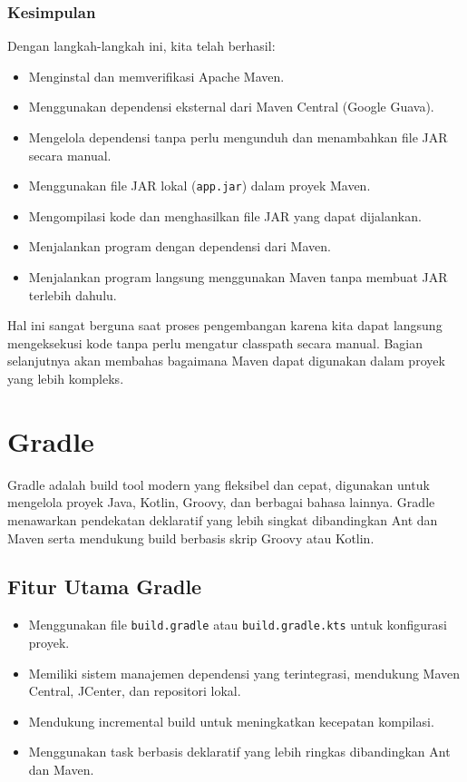 \subsubsection{Kesimpulan}
Dengan langkah-langkah ini, kita telah berhasil:
\begin{itemize}
	\item Menginstal dan memverifikasi Apache Maven.
	\item Menggunakan dependensi eksternal dari Maven Central (Google Guava).
	\item Mengelola dependensi tanpa perlu mengunduh dan menambahkan file JAR secara manual.
	\item Menggunakan file JAR lokal (\texttt{app.jar}) dalam proyek Maven.
	\item Mengompilasi kode dan menghasilkan file JAR yang dapat dijalankan.
	\item Menjalankan program dengan dependensi dari Maven.
	\item Menjalankan program langsung menggunakan Maven tanpa membuat JAR terlebih dahulu.
\end{itemize}

Hal ini sangat berguna saat proses pengembangan karena kita dapat langsung mengeksekusi kode tanpa perlu mengatur classpath secara manual. Bagian selanjutnya akan membahas bagaimana Maven dapat digunakan dalam proyek yang lebih kompleks.


\section{Gradle}
Gradle adalah build tool modern yang fleksibel dan cepat, digunakan untuk mengelola proyek Java, Kotlin, Groovy, dan berbagai bahasa lainnya. Gradle menawarkan pendekatan deklaratif yang lebih singkat dibandingkan Ant dan Maven serta mendukung build berbasis skrip Groovy atau Kotlin.

\subsection{Fitur Utama Gradle}
\begin{itemize}
	\item Menggunakan file \texttt{build.gradle} atau \texttt{build.gradle.kts} untuk konfigurasi proyek.
	\item Memiliki sistem manajemen dependensi yang terintegrasi, mendukung Maven Central, JCenter, dan repositori lokal.
	\item Mendukung incremental build untuk meningkatkan kecepatan kompilasi.
	\item Menggunakan task berbasis deklaratif yang lebih ringkas dibandingkan Ant dan Maven.
\end{itemize}

